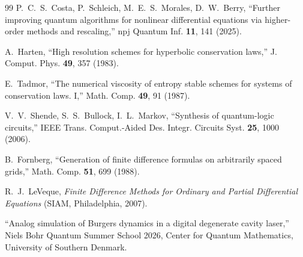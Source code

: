\documentclass[aps,prx,twocolumn,notitlepage,superscriptaddress,floatfix,10pt]{revtex4-2}
\begin{document}
\begin{thebibliography}{99}
 P.~C.~S.~Costa, P.~Schleich, M.~E.~S.~Morales, D.~W.~Berry, ``Further improving
quantum algorithms for nonlinear differential equations via higher-order methods and rescaling,''
npj Quantum Inf. \textbf{11}, 141 (2025).

 A.~Harten, ``High resolution schemes for hyperbolic conservation laws,''
J. Comput. Phys. \textbf{49}, 357 (1983).

 E.~Tadmor, ``The numerical viscosity of entropy stable schemes for systems of
conservation laws. I,'' Math. Comp. \textbf{49}, 91 (1987).

 V.~V.~Shende, S.~S.~Bullock, I.~L.~Markov, ``Synthesis of quantum-logic
circuits,'' IEEE Trans. Comput.-Aided Des. Integr. Circuits Syst. \textbf{25}, 1000 (2006).

 B.~Fornberg, ``Generation of finite difference formulas on arbitrarily spaced
grids,'' Math. Comp. \textbf{51}, 699 (1988).

 R.~J.~LeVeque, \emph{Finite Difference Methods for Ordinary and Partial
Differential Equations} (SIAM, Philadelphia, 2007).

 ``Analog simulation of Burgers dynamics in a digital degenerate cavity laser,''
Niels Bohr Quantum Summer School 2026, Center for Quantum Mathematics, University of Southern Denmark.

\end{thebibliography}
\end{document}
